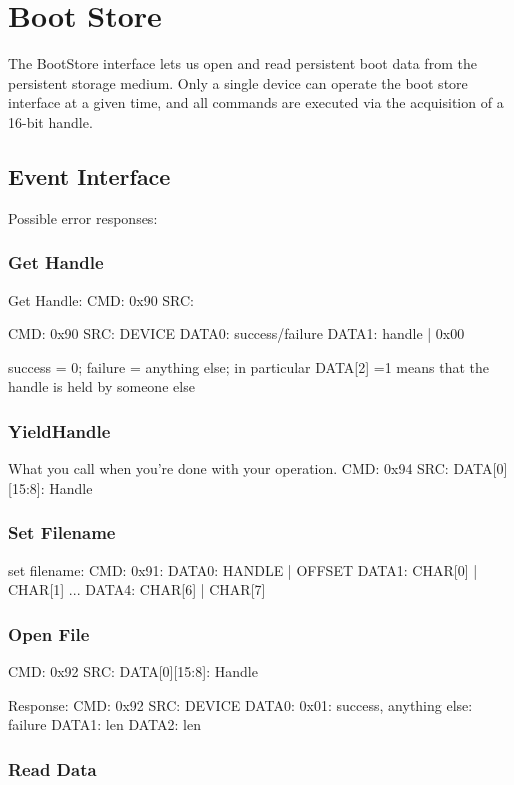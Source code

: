 \section{Boot Store}

The BootStore interface lets us open and read persistent boot data
from the persistent storage medium. Only a single device can operate
the boot store interface at a given time, and all commands are
executed via the acquisition of a 16-bit handle.

\subsection{Event Interface}

Possible error responses: 



\subsubsection{Get Handle}

Get Handle: 
CMD: 0x90
SRC: 

\response
CMD: 0x90
SRC: DEVICE
DATA0: success/failure
DATA1: handle | 0x00

success = 0; failure = anything else; 
in particular DATA[2] =1 means that the handle is held 
by someone else


\subsubsection{YieldHandle}
What you call when you're done with your operation. 
CMD: 0x94
SRC: 
DATA[0][15:8]: Handle

\subsubsection{Set Filename}
set filename: 
CMD: 0x91:
DATA0: HANDLE | OFFSET
DATA1:  CHAR[0] | CHAR[1]
...
DATA4:  CHAR[6] | CHAR[7]

\subsubsection{Open File} 
CMD: 0x92
SRC: 
DATA[0][15:8]: Handle

Response: 
CMD: 0x92
SRC: DEVICE
DATA0: 0x01: success, anything else: failure
DATA1: len
DATA2: len

\subsubsection{Read Data}

